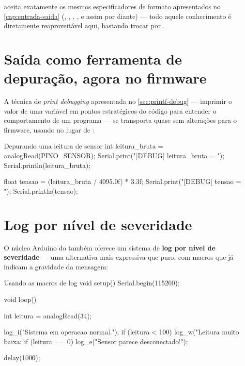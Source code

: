 \begin{dica}
 aceita exatamente os mesmos especificadores de formato apresentados no \cref{cap:entrada-saida} (, , , , e assim por diante) — todo aquele conhecimento é diretamente reaproveitável aqui, bastando trocar  por .
\end{dica}

\section{Saída como ferramenta de depuração, agora no firmware}

A técnica de \emph{print debugging} apresentada no \cref{sec:printf-debug} — imprimir o valor de uma variável em pontos estratégicos do código para entender o comportamento de um programa — se transporta quase sem alterações para o firmware, usando  no lugar de :

\begin{codigoc}{Depurando uma leitura de sensor}
int leitura_bruta = analogRead(PINO_SENSOR);
Serial.print("[DEBUG] leitura_bruta = ");
Serial.println(leitura_bruta);

float tensao = (leitura_bruta / 4095.0f) * 3.3f;
Serial.print("[DEBUG] tensao = ");
Serial.println(tensao);
\end{codigoc}

\section{Log por nível de severidade}

O núcleo Arduino do \ESP{} também oferece um sistema de \textbf{log por nível de severidade} — uma alternativa mais expressiva que  puro, com macros que já indicam a gravidade da mensagem:

\begin{codigoc}{Usando as macros de log}
void setup() {
    Serial.begin(115200);
}

void loop() {
    int leitura = analogRead(34);

    log_i("Sistema em operacao normal.");
    if (leitura < 100) {
        log_w("Leitura muito baixa: %
    }
    if (leitura == 0) {
        log_e("Sensor parece desconectado!");
    }

    delay(1000);
}
\end{codigoc}

